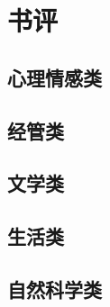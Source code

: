 \chapter{书评}

\section{心理情感类}


\section{经管类}







\section{文学类}











\section{生活类}





\section{自然科学类}

